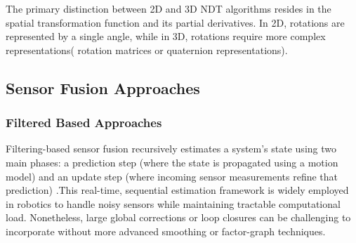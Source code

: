The primary distinction between 2D and 3D NDT algorithms resides in the spatial transformation function and its partial derivatives. In 2D, rotations are represented by a single angle, while in 3D, rotations require more complex representations( rotation matrices or quaternion representations).

\subsection{Sensor Fusion Approaches}

\subsubsection{Filtered Based Approaches}
Filtering-based sensor fusion recursively estimates a system’s state using two main phases: a prediction step (where the state is propagated using a motion model) and an update step (where incoming sensor measurements refine that prediction) \cite{thrun2005probabilistic}.This real-time, sequential estimation framework is widely employed in robotics to handle noisy sensors while maintaining tractable computational load. Nonetheless, large global corrections or loop closures can be challenging to incorporate without more advanced smoothing or factor-graph techniques\cite{cadena2016past}.

